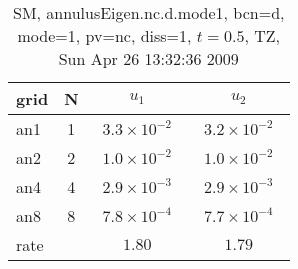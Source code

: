 \begin{table}[hbt]\tableFont %
\begin{center}
\begin{tabular}{|l|c|c|c|} \hline\hline 
grid  & N &  $u_1$ & $u_2$  \\ \hline 
                 an1 &     1 & ~$3.3\times10^{ -2}$~ & ~$3.2\times10^{ -2}$~  \\ \hline
                 an2 &     2 & ~$1.0\times10^{ -2}$~ & ~$1.0\times10^{ -2}$~  \\ \hline
                 an4 &     4 & ~$2.9\times10^{ -3}$~ & ~$2.9\times10^{ -3}$~  \\ \hline
                 an8 &     8 & ~$7.8\times10^{ -4}$~ & ~$7.7\times10^{ -4}$~  \\ \hline
    rate             &       &       $1.80$          &       $1.79$           \\ \hline\hline
\end{tabular}
\caption{SM, annulusEigen.nc.d.mode1, bcn=d, mode=1, pv=nc, diss=1, $t=0.5$,  TZ, Sun Apr 26 13:32:36 2009}\label{table:annulusEigen.nc.d.mode1}
\end{center}
\end{table}
